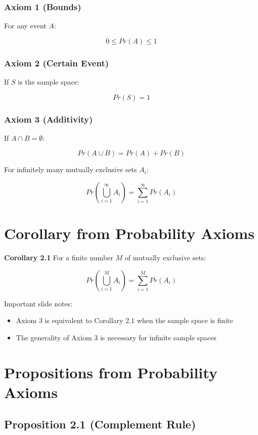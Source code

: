 \documentclass[12pt]{article}
\begin{document}
\subsubsection*{Axiom 1 (Bounds)}

For any event $A$:

\[
0 \le Pr(A) \le 1
\]

\subsubsection*{Axiom 2 (Certain Event)}

If $S$ is the sample space:

\[
Pr(S) = 1
\]

\subsubsection*{Axiom 3 (Additivity)}

If $A \cap B = \emptyset$:

\[
Pr(A \cup B) = Pr(A) + Pr(B)
\]

For infinitely many mutually exclusive sets $A_i$:

\[
Pr\left(\bigcup_{i=1}^{\infty} A_i\right) = \sum_{i=1}^{\infty} Pr(A_i)
\]

\section{Corollary from Probability Axioms}

\textbf{Corollary 2.1}  
For a finite number $M$ of mutually exclusive sets:

\[
Pr\left(\bigcup_{i=1}^{M} A_i\right) = \sum_{i=1}^{M} Pr(A_i)
\]

Important slide notes:

\begin{itemize}
    \item Axiom 3 is equivalent to Corollary 2.1 when the sample space is finite
    \item The generality of Axiom 3 is necessary for infinite sample spaces
\end{itemize}

\section{Propositions from Probability Axioms}

\subsection*{Proposition 2.1 (Complement Rule)}
\end{document}
